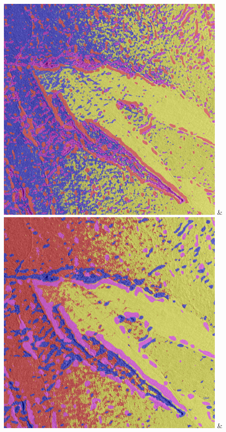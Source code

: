 \begin{table}[h!]
\begin{tabularx}{\textwidth}
		\includegraphics[width=0.9\linewidth]{images/gen/filter_size/p03_03.png_0.50.png} &
		\includegraphics[width=0.9\linewidth]{images/gen/filter_size/p03_03.png_0.75.png} &

\end{tabularx}
\end{table}

